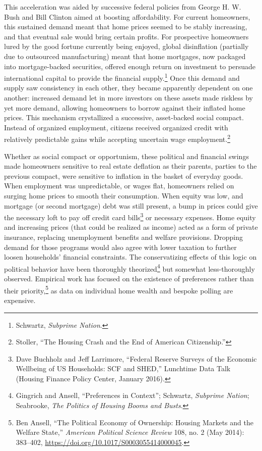 \documentclass[12pt,oneside]{psthesis}
\begin{document}
This acceleration was aided by successive federal policies from George H. W. Bush and Bill Clinton aimed at boosting affordability.
For current homeowners, this sustained demand meant that home prices seemed to be stably increasing, and that eventual sale would bring certain profits.
For prospective homeowners lured by the good fortune currently being enjoyed, global disinflation (partially due to outsourced manufacturing) meant that home mortgages, now packaged into mortgage-backed securities, offered enough return on investment to persuade international capital to provide the financial supply.\footnote{Schwartz, \emph{Subprime Nation}.}
Once this demand and supply saw consistency in each other, they became apparently dependent on one another: increased demand let in more investors on these assets made riskless by yet more demand, allowing homeowners to borrow against their inflated home prices.
This mechanism crystallized a successive, asset-backed social compact.
Instead of organized employment, citizens received organized credit with relatively predictable gains while accepting uncertain wage employment.\footnote{Stoller, ``The Housing Crash and the End of American Citizenship.''}

Whether as social compact or opportunism, these political and financial swings made homeowners sensitive to real estate deflation as their parents, parties to the previous compact, were sensitive to inflation in the basket of everyday goods.
When employment was unpredictable, or wages flat, homeowners relied on surging home prices to smooth their consumption.
When equity was low, and mortgage (or second mortgage) debt was still present, a bump in prices could give the necessary loft to pay off credit card bills\footnote{Dave Buchholz and Jeff Larrimore, ``Federal Reserve Surveys of the Economic Wellbeing of US Households: SCF and SHED,'' Lunchtime Data Talk (Housing Finance Policy Center, January 2016).} or necessary expenses.
Home equity and increasing prices (that could be realized as income) acted as a form of private insurance, replacing unemployment benefits and welfare provisions.
Dropping demand for those programs would also agree with lower taxation to further loosen households' financial constraints.
The conservatizing effects of this logic on political behavior have been thoroughly theorized\footnote{Gingrich and Ansell, ``Preferences in Context''; Schwartz, \emph{Subprime Nation}; Seabrooke, \emph{The Politics of Housing Booms and Busts}.} but somewhat less-thoroughly observed.
Empirical work has focused on the existence of preferences rather than their priority,\footnote{Ben Ansell, ``The Political Economy of Ownership: Housing Markets and the Welfare State,'' \emph{American Political Science Review} 108, no. 2 (May 2014): 383--402, \url{https://doi.org/10.1017/S0003055414000045}.} as data on individual home wealth and bespoke polling are expensive.
\end{document}
